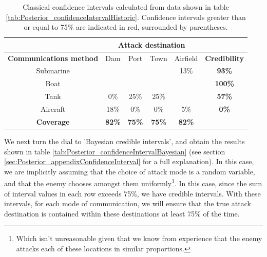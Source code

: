 \documentclass[11pt,fullpage]{book}
\begin{document}
\begin{table}[htbp]
  \centering
    \begin{tabular}{cccccc}
    \toprule
          & \multicolumn{4}{c}{\textbf{Attack destination}} & \multicolumn{1}{c}{\textbf{}} \\
    \midrule
    \textbf{Communications method} & Dam & Port & Town & Airfield   & \textbf{Credibility} \\
    Submarine & \color{red}{$[$73\%}  & \color{red}{50\%}  & \color{red}{50\%$]$}  & 13\%  & \textbf{93\%} \\
    Boat  & \color{red}{$[$9\%}   & \color{red}{25\%}  & \color{red}{25\%}  & \color{red}{16\%$]$}  & \textbf{100\%} \\
    Tank  & 0\%   & 25\%  & 25\%  & \color{red}{$[$66\%$]$}  & \textbf{57\%} \\
    Aircraft & 18\%   & 0\%  & 0\%   & 5\%   & \textbf{0\%} \\
    \bottomrule
    \textbf{Coverage} & \textbf{82\%}  & \textbf{75\%}  & \textbf{75\%}  & \textbf{82\%} &  \\
    \end{tabular}%
  \caption{Classical confidence intervals calculated from data shown in table \ref{tab:Posterior_confidenceIntervalHistoric}. Confidence intervals greater than or equal to 75\% are indicated in red, surrounded by parentheses.}\label{tab:Posterior_confidenceIntervalClassical}%
\end{table}%

We next turn the dial to 'Bayesian credible intervals', and obtain the results shown in table \ref{tab:Posterior_confidenceIntervalBayesian} (see section \ref{sec:Posterior_appendixConfidenceInterval} for a full explanation). In this case, we are implicitly assuming that the choice of attack mode is a random variable, and that the enemy chooses amongst them uniformly\footnote{Which isn't unreasonable given that we know from experience that the enemy attacks each of these locations in similar proportions.}. In this case, since the sum of interval values in each row exceeds 75\%, we have credible intervals. With these intervals, for each mode of communication, we will ensure that the true attack destination is contained within these destinations at least 75\% of the time.
\end{document}
